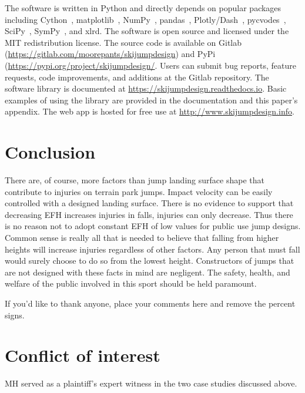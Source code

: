 \documentclass[smallextended]{svjour3}       %
\begin{document}
The software is written in Python and directly depends on popular packages
including Cython~\cite{Behnel2011}, matplotlib~\cite{Hunter2007},
NumPy~\cite{Oliphant2006}, pandas~\cite{McKinney2020},
Plotly/Dash~\cite{Plotly2015}, pycvodes~\cite{Dahlgren2018},
SciPy~\cite{Virtanen2020}, SymPy~\cite{Meurer2017}, and xlrd. The software is
open source and licensed under the MIT redistribution license. The source code
is available on Gitlab (\url{https://gitlab.com/moorepants/skijumpdesign}) and
PyPi (\url{https://pypi.org/project/skijumpdesign/}. Users can submit bug
reports, feature requests, code improvements, and additions at the Gitlab
repository. The software library is documented at
\url{https://skijumpdesign.readthedocs.io}. Basic examples of using the library
are provided in the documentation and this paper's appendix. The web app is
hosted for free use at \url{http://www.skijumpdesign.info}.

\section{Conclusion}
\label{sec:conc}
%
There are, of course, more factors than jump landing surface shape that
contribute to injuries on terrain park jumps. Impact velocity can be easily
controlled with a designed landing surface. There is no evidence to support
that decreasing EFH increases injuries in falls,  injuries can only decrease.
Thus there is no reason not to adopt constant EFH of low values for public use
jump designs.  Common sense is really all that is needed to believe that
falling from higher heights will increase injuries regardless of other factors.
Any person that must fall would surely choose to do so from the lowest height.
Constructors of jumps that are not designed with these facts in mind are
negligent. The safety, health, and welfare of the public involved in this sport
should be held paramount.

\begin{acknowledgements}
If you'd like to thank anyone, place your comments here
and remove the percent signs.
\end{acknowledgements}

%
\section*{Conflict of interest}
\label{sec:conflict}
%
MH served as a plaintiff's expert witness in the two case studies discussed above.
\end{document}
